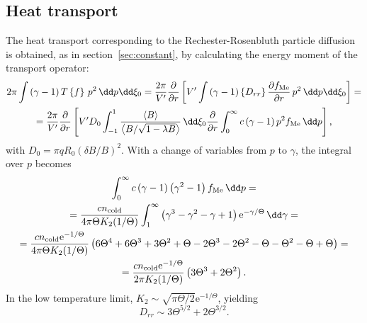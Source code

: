 \documentclass{notes}
\newcommand{\ee}{\mathrm{e}}
\newcommand{\fMe}{f_{\rm Me}}
\newcommand{\ncold}{n_{\rm cold}}
\begin{document}
    \subsection{Heat transport}
    The heat transport corresponding to the Rechester-Rosenbluth particle
    diffusion is obtained, as in section~\ref{sec:constant}, by calculating the
    energy moment of the transport operator:
    \begin{equation}
        \begin{gathered}
            2\pi\int\left(\gamma-1\right) T\left\{f\right\}\,p^2\,\dd p\dd\xi_0 =
                \frac{2\pi}{V'}\frac{\partial}{\partial r}\left[ V'
                    \int\left(\gamma-1\right)\left\{D_{rr}\right\} \frac{\partial\fMe}{\partial r}\,p^2\,\dd p\dd\xi_0
                \right] =\\
            = \frac{2\pi}{V'}\frac{\partial}{\partial r}\left[ V'D_0
                \int_{-1}^1 \frac{\left\langle B \right\rangle}{\left\langle B/\sqrt{1-\lambda B}\right\rangle}\,\dd\xi_0
                \frac{\partial}{\partial r}\int_0^\infty c\left(\gamma-1\right)p^2\fMe\,\dd p
            \right],
        \end{gathered}
    \end{equation}
    with $D_0 = \pi qR_0(\delta B/B)^2$. With a change of variables from $p$ to
    $\gamma$, the integral over $p$ becomes
    \begin{equation}
        \begin{gathered}
            \int_0^\infty c\left(\gamma-1\right)\left(\gamma^2-1\right)\fMe\,\dd p =\\
            = \frac{c\ncold}{4\pi\Theta K_2(1/\Theta)}\int_1^\infty\left(\gamma^3-\gamma^2-\gamma+1\right)\ee^{-\gamma/\Theta}\,\dd\gamma =\\
            = \frac{c\ncold\ee^{-1/\Theta}}{4\pi\Theta K_2(1/\Theta)}\left(
                6\Theta^4 + 6\Theta^3 + 3\Theta^2 + \Theta - 2\Theta^3 - 2\Theta^2 - \Theta -
                \Theta^2 - \Theta + \Theta
            \right) =\\
            = \frac{c\ncold\ee^{-1/\Theta}}{2\pi K_2(1/\Theta)}\left(
                3\Theta^3 + 2\Theta^2
            \right).
        \end{gathered}
    \end{equation}
    In the low temperature limit, $K_2\sim\sqrt{\pi\Theta/2}\ee^{-1/\Theta}$,
    yielding
    \begin{equation}
        D_{rr}\sim 3\Theta^{5/2} + 2\Theta^{3/2}.
    \end{equation}
\end{document}
